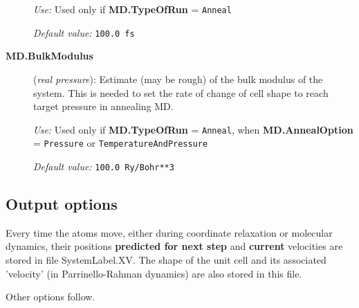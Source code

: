 \documentclass[11pt]{article}
\begin{document}
\begin{description}
{\it Use:} Used only if {\bf MD.TypeOfRun} = {\tt Anneal}

{\it Default value:} {\tt 100.0 fs}

\item[{\bf MD.BulkModulus}] ({\it real pressure}): 
Estimate (may be rough) of the bulk modulus of the system.
This is needed to set the rate of change of cell shape
to reach target pressure in annealing MD.

{\it Use:} Used only if {\bf MD.TypeOfRun} = {\tt Anneal}, when
{\bf MD.AnnealOption} = {\tt Pressure} or {\tt TemperatureAndPressure}

{\it Default value:}  {\tt 100.0 Ry/Bohr**3}
        

\end{description}

\subsection{Output options}

Every time the atoms move, either during coordinate relaxation or
molecular dynamics, their positions {\bf predicted for next step} and
{\bf current} velocities are stored in file SystemLabel.XV. The shape
of the unit cell and its associated 'velocity' (in Parrinello-Rahman
dynamics) are also stored in this file.

Other options follow. 
        
\end{document}
